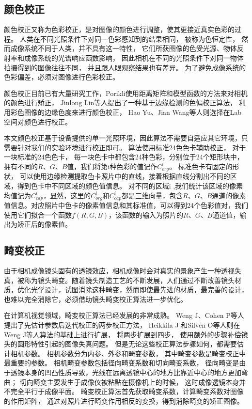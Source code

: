 \subsection{颜色校正}


颜色校正又称为色彩校正，是对图像的颜色进行调整，使其更接近真实色彩的过程。
人类在不同光照条件下对同一色彩感知到的结果相同，
被称为色恒定性，
然而成像系统不同于人类，并不具有这一特性，
它们所获图像的色受光源、物体反射率和成像系统的光谱响应函数影响，
因此相机在不同的光照条件下对同一物体拍摄得到的图像往往不同，
并且跟人眼观察结果也有差异。
为了避免成像系统的色彩偏差，必须对图像进行色彩校正。

颜色校正目前已有大量研究工作，Porikli\cite{weng2005novel}使用距离矩阵和模型函数的方法来对相机的颜色进行矫正，
Jinlong Lin\cite{porikli2003inter}等人提出了一种基于边缘检测的色偏校正算法，
利用彩色图像的边缘色度来进行颜色校正，
Hao Yu、Jian Wang\cite{yu2009color}等人则选择在Lab空间对颜色进行校正。

本文颜色校正基于设备提供的单一光照环境，因此算法不需要自适应其它环境，只需要针对我们的实验环境进行校正即可。
算法使用标准24色色卡辅助校正，
对于一块标准的24色色卡，
 每一块色卡中都包含24种色彩，分别位于24个矩形块中，拥有不同的$R$、$G$、$B$值，我们将第i种色彩的值记作$C_{org}^i$。
 标准色卡有固定的形状，
 可以使用边缘检测提取色卡照片中的直线，接着根据直线分割出不同的区域，得到色卡中不同区域的颜色值信息。
 对不同的区域i ,我们统计该区域的像素均值记为$C_{cap}^i$，显然，这里的$C_{org}^i$和$C_{cap}^i$都是三维向量，包含$R$、$G$、$B$通道的像素值信息。对应照片中色卡的像素值信息和其标准值，可以得到24个色彩值对，我们使用它们拟合一个函数$f(R,G,B)$，该函数的输入为照片的$R$、$G$、$B$通道值，输出为矫正后的像素值。


\subsection{畸变校正}

由于相机成像镜头固有的透镜效应，相机成像时会对真实的景象产生一种透视失真，被称为镜头畸变。随着镜头制造工艺的不断发展，人们通过不断改善镜头材质，优化光学设计，试图消除这种畸变，然而即使最先进的材质，最完善的设计，也难以完全消除它，必须借助镜头畸变校正算法进一步优化。

在计算机视觉领域，畸变校正算法已经发展的非常成熟。
Weng J、Cohen P\cite{weng1992camera}等人提出了先估计参数后迭代校正的两步校正方法，
Heikkila J 和Silven O\cite{heikkila1997four}等人则在Weng J等人算法的基础上进行扩展，
将两步扩展到四步，
使用额外的步骤补偿镜头的圆形特性引起的图像失真问题。
但是无论这些校正算法步骤如何，都需要估计相机参数。
相机参数分为内参、外参和畸变参数，
其中畸变参数是畸变校正中最重要的参数。
相机畸变参数包括径向畸变系数和切向畸变系数，
径向畸变是由于透镜本身的凹凸性质导致，光线在远离透镜中心的地方比靠近中心的地方更加弯曲；
切向畸变主要发生于成像仪被粘贴在摄像机上的时候，
这时成像透镜本身并不完全平行于成像平面。
畸变校正算法首先获取畸变系数，计算畸变系数对图像的作用矩阵，
通过对照片进行畸变作用相反的变换，得到消除畸变的矫正图像。

